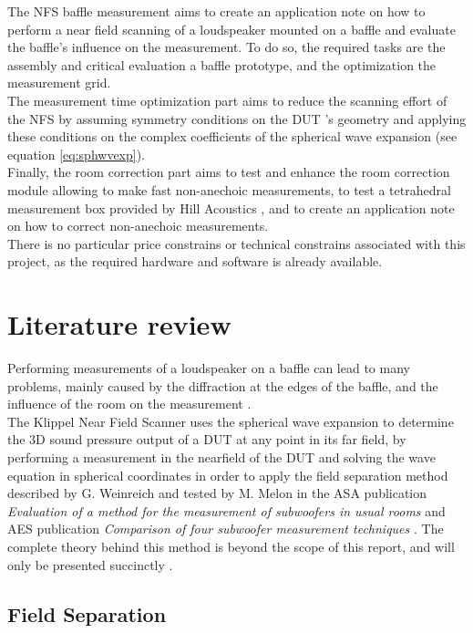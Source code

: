 \documentclass{report}
\begin{document}
The NFS baffle measurement aims to create an application note on how to perform a near field scanning of a loudspeaker mounted on a baffle and evaluate the baffle's influence on the measurement. To do so, the required tasks are the assembly and critical evaluation a baffle prototype, and the optimization the measurement grid.\\
The measurement time optimization part aims to reduce the scanning effort of the NFS by assuming symmetry conditions on the DUT 's geometry and applying these conditions on the complex coefficients of the spherical wave expansion (see equation \ref{eq:sphwvexp}). \\
Finally, the room correction part aims to test and enhance the room correction module allowing to make fast non-anechoic measurements, to test a tetrahedral measurement box provided by Hill Acoustics \citep[see][]{tetbox}, and to create an application note on how to correct non-anechoic measurements. \\

There is no particular price constrains or technical constrains associated with this project, as the required hardware and software is already available. 

\newpage

\section{Literature review}

Performing measurements of a loudspeaker on a baffle can lead to many problems, mainly caused by the diffraction at the edges of the baffle, and the influence of the room on the measurement \cite{LIS}.\\
The Klippel Near Field Scanner uses the spherical wave expansion to determine the 3D sound pressure output of a DUT at any point in its far field, by performing a measurement in the nearfield of the DUT and solving the wave equation in spherical coordinates in order to apply the field separation method described by G. Weinreich and tested by M. Melon in the ASA publication \textit{Evaluation of a method for the measurement of subwoofers in usual rooms} and AES publication \textit{Comparison of four subwoofer measurement techniques}  \cite{melon1, melon2}. The complete theory behind this method is beyond the scope of this report, and will only be presented succinctly \citep[see][sect.~3]{aeshs} \citep[see][chap.~6]{Fourier}. 

\subsection{Field Separation}
\label{sec:FieldSep}
\end{document}
